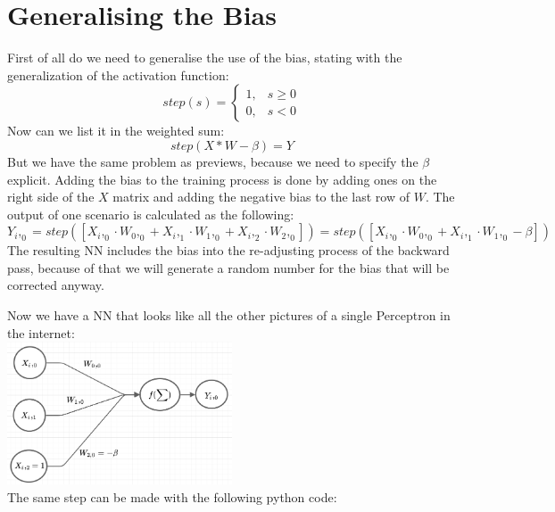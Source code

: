 \documentclass[
]{book}
\begin{document}
\hypertarget{generalising-the-bias}{%
\section{Generalising the Bias}\label{generalising-the-bias}}

First of all do we need to generalise the use of the bias, stating with the generalization of the activation function:
\[ 
step(s)= 
\begin{cases}
    1,& s   \geq 0\\
    0,& s < 0
\end{cases}
\]
Now can we list it in the weighted sum:
\[
  step(X * W - \beta) = Y
\]
But we have the same problem as previews, because we need to specify the \(\beta\) explicit. Adding the bias to the training process is done by adding ones on the right side of the \(X\) matrix and adding the negative bias to the last row of \(W\). The output of one scenario is calculated as the following:
\[
  Y_i,_0 = step([X_i,_0 \cdot W_0,_0 + X_i,_1 \cdot W_1,_0 + X_i,_2 \cdot W_2,_0]) = step([X_i,_0 \cdot W_0,_0 + X_i,_1 \cdot W_1,_0 - \beta])
\]
The resulting NN includes the bias into the re-adjusting process of the backward pass, because of that we will generate a random number for the bias that will be corrected anyway.

Now we have a NN that looks like all the other pictures of a single Perceptron in the internet:\\
\includegraphics[width=0.5\textwidth,height=\textheight]{./img/NN_02.png}\\
The same step can be made with the following python code:
\end{document}
